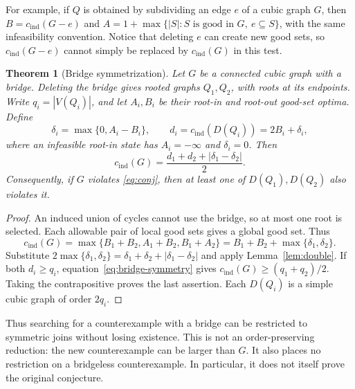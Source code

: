 \documentclass[11pt]{article}
\newtheorem{theorem}{Theorem}[section]
\newcommand{\cind}{c_{\mathrm{ind}}}
\begin{document}
For example, if $Q$ is obtained by subdividing an edge $e$ of a cubic
graph $G$, then $B=\cind(G-e)$ and
$A=1+\max\{|S|:S\text{ is good in }G,\ e\subseteq S\}$,
with the same infeasibility convention. Notice that deleting $e$
can create new good sets, so $\cind(G-e)$ cannot simply be replaced
by $\cind(G)$ in this test.

\begin{theorem}[Bridge symmetrization]\label{thm:bridge-symmetry}
Let $G$ be a connected cubic graph with a bridge. Deleting the bridge
gives rooted graphs $Q_1,Q_2$, with roots at its endpoints. Write
$q_i=|V(Q_i)|$, and let $A_i,B_i$ be their root-in and root-out
good-set optima. Define
\[
 \delta_i=\max\{0,A_i-B_i\},\qquad
 d_i=\cind(D(Q_i))=2B_i+\delta_i,
\]
where an infeasible root-in state has $A_i=-\infty$ and
$\delta_i=0$. Then
\begin{equation}\label{eq:bridge-symmetry}
 \cind(G)=\frac{d_1+d_2+|\delta_1-\delta_2|}{2}.
\end{equation}
Consequently, if $G$ violates \eqref{eq:conj}, then at least one
of $D(Q_1),D(Q_2)$ also violates it.
\end{theorem}
\begin{proof}
An induced union of cycles cannot use the bridge, so at most one
root is selected. Each allowable pair of local good sets gives a
global good set. Thus
\[
 \cind(G)=\max\{B_1+B_2,A_1+B_2,B_1+A_2\}
 =B_1+B_2+\max\{\delta_1,\delta_2\}.
\]
Substitute
$2\max\{\delta_1,\delta_2\}=\delta_1+\delta_2+
|\delta_1-\delta_2|$ and apply Lemma~\ref{lem:double}.
If both $d_i\geq q_i$, equation~\eqref{eq:bridge-symmetry} gives
$\cind(G)\geq(q_1+q_2)/2$. Taking the contrapositive proves the
last assertion. Each $D(Q_i)$ is a simple cubic graph of order $2q_i$.
\end{proof}

Thus searching for a counterexample with a bridge can be restricted
to symmetric joins without losing existence. This is not an
order-preserving reduction: the new counterexample can be larger
than $G$. It also places no restriction on a bridgeless counterexample.
In particular, it does not itself prove the original conjecture.
\end{document}
